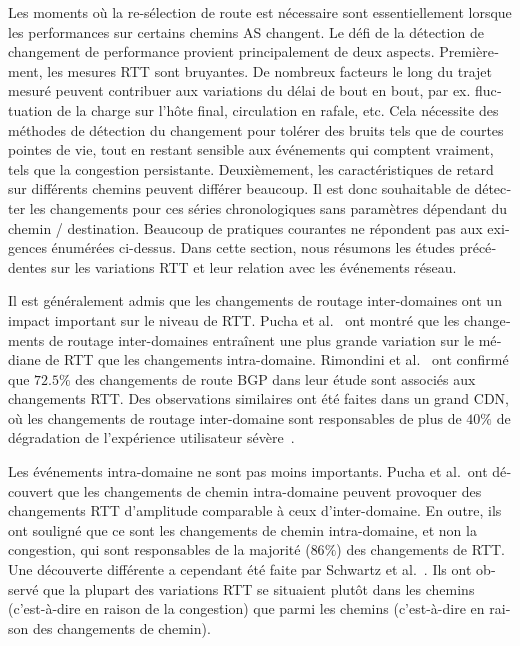 \begin{otherlanguage}{french}
Les moments où la re-sélection de route est nécessaire sont essentiellement lorsque les performances sur certains chemins AS changent.
Le défi de la détection de changement de performance provient principalement de deux aspects.
Premièrement, les mesures RTT sont bruyantes.
De nombreux facteurs le long du trajet mesuré peuvent contribuer aux variations du délai de bout en bout, 
par ex. fluctuation de la charge sur l'hôte final, circulation en rafale, etc.
Cela nécessite des méthodes de détection du changement pour tolérer des bruits tels que de courtes pointes de vie, tout en restant sensible aux événements qui comptent vraiment, tels que la congestion persistante.
Deuxièmement, les caractéristiques de retard sur différents chemins peuvent différer beaucoup.
Il est donc souhaitable de détecter les changements pour ces séries chronologiques sans paramètres dépendant du chemin / destination.
Beaucoup de pratiques courantes ne répondent pas aux exigences énumérées ci-dessus.
Dans cette section, nous résumons les études précédentes sur les variations RTT et leur relation avec les événements réseau.

Il est généralement admis que les changements de routage inter-domaines ont un impact important sur le niveau de RTT.
Pucha et al.~\cite{Pucha2007} ont montré que les changements de routage inter-domaines entraînent une plus grande variation sur le médiane de RTT que les changements intra-domaine.
Rimondini et al.~\cite{Rimondini2014} ont confirmé que $72.5\%$ des changements de route BGP dans leur étude sont associés aux changements RTT.
Des observations similaires ont été faites dans un grand \ac{CDN}, où les changements de routage inter-domaine sont responsables de plus de $40\%$ de dégradation de l'expérience utilisateur sévère~\cite{Zhu2012}.

Les événements intra-domaine ne sont pas moins importants. Pucha et al.~\cite{Pucha2007}ont découvert que les changements de chemin intra-domaine peuvent provoquer des changements RTT d'amplitude comparable à ceux d'inter-domaine.
En outre, ils ont souligné que ce sont les changements de chemin intra-domaine, et non la congestion, qui sont responsables de la majorité ($86\%$) des changements de RTT. %
Une découverte différente a cependant été faite par Schwartz et al.~\cite{Schwartz2010}. 
Ils ont observé que la plupart des variations RTT se situaient plutôt dans les chemins (c'est-à-dire en raison de la congestion) que parmi les chemins (c'est-à-dire en raison des changements de chemin).


\end{otherlanguage}
